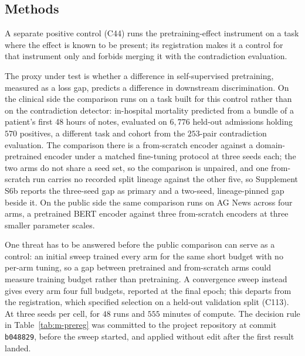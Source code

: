 %

\subsection{Methods}

A separate positive control (C44) runs the pretraining-effect instrument
on a task where the effect is known to be present; its registration makes it a control for that
instrument only and forbids merging it with the contradiction evaluation.

The proxy under test is whether a difference in self-supervised pretraining, measured as a loss gap,
predicts a difference in downstream discrimination. On the clinical side the comparison runs on a
task built for this control rather than on the contradiction detector: in-hospital mortality
predicted from a bundle of a patient's first 48 hours of notes, evaluated on $6{,}776$ held-out
admissions holding $570$ positives, a different task and cohort from the $253$-pair contradiction
evaluation. The comparison there is a from-scratch encoder against a domain-pretrained encoder under
a matched fine-tuning protocol at three seeds each; the two arms do not share a seed set, so the
comparison is unpaired, and one from-scratch run carries no recorded split lineage against the other
five, so Supplement S6b reports the three-seed gap as primary and a two-seed,
lineage-pinned gap beside it. On the public side the same comparison runs on AG News across four
arms, a pretrained BERT encoder against three from-scratch encoders at three smaller parameter
scales.

One threat has to be answered before the public comparison can serve as a control: an initial sweep
trained every arm for the same short budget with no per-arm tuning, so a gap between pretrained and
from-scratch arms could measure training budget rather than pretraining. A convergence sweep instead
gives every arm four full budgets, reported at the final epoch; this departs from the registration, which specified
selection on a held-out validation split (C113). At three seeds per cell, for $48$ runs and $555$ minutes of compute. The
decision rule in Table~\ref{tab:m-prereg} was committed to the project repository at commit
\texttt{b048829}, before the sweep started, and applied without edit after the first result landed.

